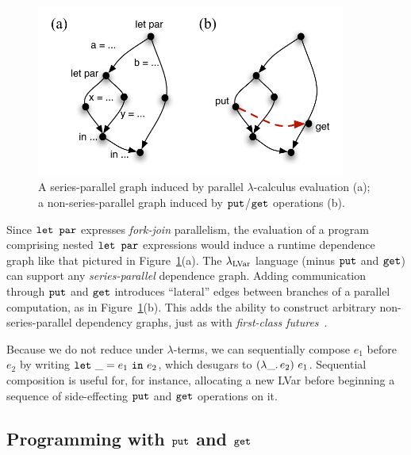\begin{figure}[tb]
  \centering 
\includegraphics[width=4in]{chapter2/figures/SeriesParallel.pdf} 
\caption{A series-parallel graph induced by parallel
  $\lambda$-calculus evaluation (a); a non-series-parallel graph
  induced by $\mbox{\texttt{put}}$/$\mbox{\texttt{get}}$ operations (b).}
  \label{f:series-parallel}
\end{figure}

Since $\mbox{\texttt{\mbox{\texttt{let}}~\mbox{\texttt{par}}}}$ expresses \emph{fork-join} parallelism, the evaluation
of a program comprising nested $\mbox{\texttt{\mbox{\texttt{let}}~\mbox{\texttt{par}}}}$ expressions would induce a
runtime dependence graph like that pictured in
Figure~\ref{f:series-parallel}(a).  The $\lambda_{\textrm{LVar}}$ language (minus
$\mbox{\texttt{put}}$ and $\mbox{\texttt{get}}$) can support any \emph{series-parallel} dependence
graph.  Adding communication through $\mbox{\texttt{put}}$ and $\mbox{\texttt{get}}$ introduces
``lateral'' edges between branches of a parallel computation, as in
Figure~\ref{f:series-parallel}(b).  This adds the ability to construct
arbitrary non-series-parallel dependency graphs, just as with
\emph{first-class futures}~\cite{beyond-nested-workstealing}.

Because we do not reduce under $\lambda$-terms, we can sequentially
compose $e_1$ before $e_2$ by writing $\mbox{\texttt{let}}~\_=e_1~\mbox{\texttt{in}}~e_2$, which
desugars to $(\lambda\_.\,e_2)~e_1$.  Sequential composition is
useful for, for instance, allocating a new LVar before beginning a
sequence of side-effecting $\mbox{\texttt{put}}$ and $\mbox{\texttt{get}}$ operations on it.

\subsection{Programming with $\mbox{\texttt{put}}$ and $\mbox{\texttt{get}}$}\label{subsection:lvars-programming-with-put-and-get}


